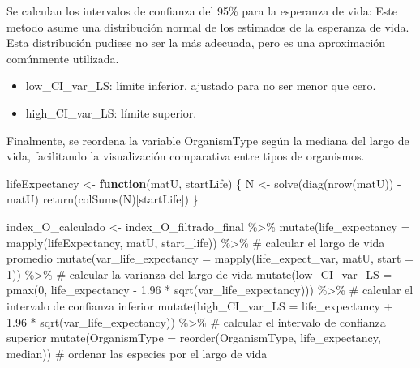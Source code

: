\documentclass[
  12pt,
  letterpaper,
]{book}
\newenvironment{Shaded}{\begin{snugshade}}{\end{snugshade}}
\newcommand{\AttributeTok}[1]{\textcolor[rgb]{0.40,0.45,0.13}{#1}}
\newcommand{\CommentTok}[1]{\textcolor[rgb]{0.37,0.37,0.37}{#1}}
\newcommand{\ControlFlowTok}[1]{\textcolor[rgb]{0.00,0.23,0.31}{\textbf{#1}}}
\newcommand{\DecValTok}[1]{\textcolor[rgb]{0.68,0.00,0.00}{#1}}
\newcommand{\FloatTok}[1]{\textcolor[rgb]{0.68,0.00,0.00}{#1}}
\newcommand{\FunctionTok}[1]{\textcolor[rgb]{0.28,0.35,0.67}{#1}}
\newcommand{\NormalTok}[1]{\textcolor[rgb]{0.00,0.23,0.31}{#1}}
\newcommand{\OtherTok}[1]{\textcolor[rgb]{0.00,0.23,0.31}{#1}}
\newcommand{\SpecialCharTok}[1]{\textcolor[rgb]{0.37,0.37,0.37}{#1}}
\providecommand{\tightlist}{%
  \setlength{\itemsep}{0pt}\setlength{\parskip}{0pt}}\usepackage{longtable,booktabs,array}
\begin{document}
Se calculan los intervalos de confianza del 95\% para la esperanza de
vida: Este metodo asume una distribución normal de los estimados de la
esperanza de vida. Esta distribución pudiese no ser la más adecuada,
pero es una aproximación comúnmente utilizada.

\begin{itemize}
\tightlist
\item
  low\_CI\_var\_LS: límite inferior, ajustado para no ser menor que
  cero.
\item
  high\_CI\_var\_LS: límite superior.
\end{itemize}

Finalmente, se reordena la variable OrganismType según la mediana del
largo de vida, facilitando la visualización comparativa entre tipos de
organismos.

\begin{Shaded}
\begin{Highlighting}[]
\NormalTok{lifeExpectancy }\OtherTok{\textless{}{-}} \ControlFlowTok{function}\NormalTok{(matU, startLife) \{}
\NormalTok{  N }\OtherTok{\textless{}{-}} \FunctionTok{solve}\NormalTok{(}\FunctionTok{diag}\NormalTok{(}\FunctionTok{nrow}\NormalTok{(matU)) }\SpecialCharTok{{-}}\NormalTok{ matU)}
  \FunctionTok{return}\NormalTok{(}\FunctionTok{colSums}\NormalTok{(N)[startLife])}
\NormalTok{\}}


\NormalTok{index\_O\_calculado }\OtherTok{\textless{}{-}}\NormalTok{ index\_O\_filtrado\_final }\SpecialCharTok{\%\textgreater{}\%}
  \FunctionTok{mutate}\NormalTok{(}\AttributeTok{life\_expectancy =} \FunctionTok{mapply}\NormalTok{(lifeExpectancy, matU, start\_life)) }\SpecialCharTok{\%\textgreater{}\%} \CommentTok{\# calcular el largo de vida promedio}
  \FunctionTok{mutate}\NormalTok{(}\AttributeTok{var\_life\_expectancy =} \FunctionTok{mapply}\NormalTok{(life\_expect\_var, matU, }\AttributeTok{start =} \DecValTok{1}\NormalTok{)) }\SpecialCharTok{\%\textgreater{}\%} \CommentTok{\# calcular la varianza del largo de vida}
  \FunctionTok{mutate}\NormalTok{(}\AttributeTok{low\_CI\_var\_LS =} \FunctionTok{pmax}\NormalTok{(}\DecValTok{0}\NormalTok{, life\_expectancy }\SpecialCharTok{{-}} \FloatTok{1.96} \SpecialCharTok{*} \FunctionTok{sqrt}\NormalTok{(var\_life\_expectancy))) }\SpecialCharTok{\%\textgreater{}\%} \CommentTok{\# calcular el intervalo de confianza inferior}
  \FunctionTok{mutate}\NormalTok{(}\AttributeTok{high\_CI\_var\_LS =}\NormalTok{ life\_expectancy }\SpecialCharTok{+} \FloatTok{1.96} \SpecialCharTok{*} \FunctionTok{sqrt}\NormalTok{(var\_life\_expectancy)) }\SpecialCharTok{\%\textgreater{}\%} \CommentTok{\# calcular el intervalo de confianza superior}
  \FunctionTok{mutate}\NormalTok{(}\AttributeTok{OrganismType =} \FunctionTok{reorder}\NormalTok{(OrganismType, life\_expectancy, median)) }\CommentTok{\# ordenar las especies por el largo de vida }
\end{Highlighting}
\end{Shaded}
\end{document}
